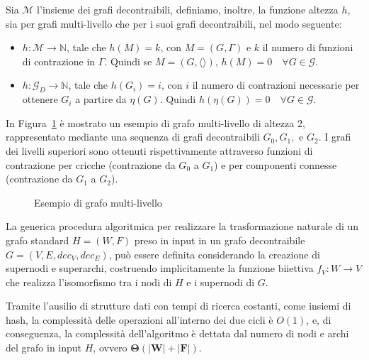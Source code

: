 Sia $\mathcal{M}$ l'insieme dei grafi decontraibili, definiamo, inoltre, la funzione altezza $h$, sia
per grafi multi-livello che per i suoi grafi decontraibili, nel modo seguente:

\begin{itemize}
    \item $h : \mathcal{M} \rightarrow \mathbb{N}$, tale che $h(M) = k$, con $M = (G, \Gamma)$ e $k$ il numero di
    funzioni di contrazione in $\Gamma$. Quindi se $M = (G, \langle \rangle)$, $h(M) = 0 \quad \forall G \in \mathcal{G}$.
    \item $h : \mathcal{G}_D \rightarrow \mathbb{N}$, tale che $h(G_i) = i$, con $i$ il numero di contrazioni
    necessarie per ottenere $G_i$ a partire da $\eta(G)$. Quindi $h(\eta(G)) = 0 \quad \forall G \in \mathcal{G}$.
\end{itemize}

In Figura~\ref{fig:multi-level-graph-example} \`e mostrato un esempio di grafo multi-livello di altezza 2,
rappresentato mediante una sequenza di grafi decontraibili $G_0, G_1,$ e $G_2$. I grafi dei livelli superiori
sono ottenuti rispettivamente attraverso funzioni di contrazione per cricche (contrazione da $G_0$ a $G_1$) e
per componenti connesse (contrazione da $G_1$ a $G_2$).

\begin{figure}
    
    \caption{Esempio di grafo multi-livello}
    \label{fig:multi-level-graph-example}
\end{figure}

\newpage

\label{subsec:algoritmo-di-trasformazione-naturale}

La generica procedura algoritmica per realizzare la trasformazione naturale di un grafo standard $H = (W, F)$
preso in input in un grafo decontraibile $G = (V, E, dec_V, dec_E)$, può essere definita considerando la creazione di
supernodi e superarchi, costruendo implicitamente la funzione biiettiva $f_V: W \rightarrow V$ che realizza
l'isomorfismo tra i nodi di $H$ e i supernodi di $G$.



Tramite l'ausilio di strutture dati con tempi di ricerca costanti, come insiemi di hash, la complessit\`a delle
operazioni all'interno dei due cicli \`e $O(1)$,
e, di conseguenza, la complessit\`a dell'algoritmo \`e dettata dal numero di nodi e archi del grafo in input $H$,
ovvero $\mathbf{\Theta(|W| + |F|)}$.